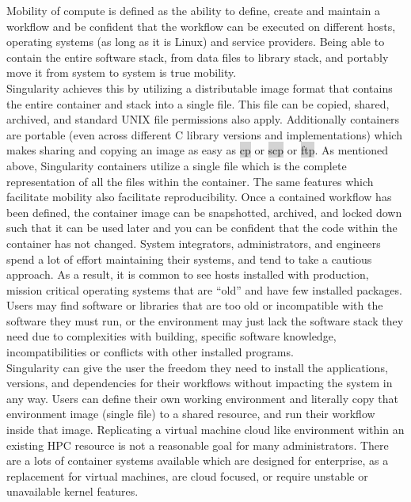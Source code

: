 \documentclass[a4paper]{article}
\newcounter{subsubsubsection}[subsubsection]
\begin{document}
Mobility of compute is defined as the ability to define, create and maintain a workflow and be confident that the workflow can be executed on different hosts, operating systems (as long as it is Linux) and service providers. Being able to contain the entire software stack, from data files to library stack, and portably move it from system to system is true mobility.
\\[0.2in]
Singularity achieves this by utilizing a distributable image format that contains the entire container and stack into a single file. This file can be copied, shared, archived, and standard UNIX file permissions also apply. Additionally containers are portable (even across different C library versions and implementations) which makes sharing and copying an image as easy as \colorbox{lightgray}{cp} or \colorbox{lightgray}{scp} or \colorbox{lightgray}{ftp}.
As mentioned above, Singularity containers utilize a single file which is the complete representation of all the files within the container. The same features which facilitate mobility also facilitate reproducibility. Once a contained workflow has been defined, the container image can be snapshotted, archived, and locked down such that it can be used later and you can be confident that the code within the container has not changed.
System integrators, administrators, and engineers spend a lot of effort maintaining their systems, and tend to take a cautious approach. As a result, it is common to see hosts installed with production, mission critical operating systems that are “old” and have few installed packages. Users may find software or libraries that are too old or incompatible with the software they must run, or the environment may just lack the software stack they need due to complexities with building, specific software knowledge, incompatibilities or conflicts with other installed programs.
\\[0.2in]
Singularity can give the user the freedom they need to install the applications, versions, and dependencies for their workflows without impacting the system in any way. Users can define their own working environment and literally copy that environment image (single file) to a shared resource, and run their workflow inside that image.
Replicating a virtual machine cloud like environment within an existing HPC resource is not a reasonable goal for many administrators. There are a lots of container systems available which are designed for enterprise, as a replacement for virtual machines, are cloud focused, or require unstable or unavailable kernel features.
\end{document}
